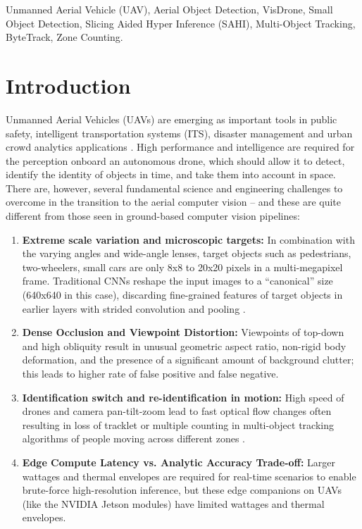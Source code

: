 \documentclass[conference]{IEEEtran}
\begin{document}
\begin{IEEEkeywords}
Unmanned Aerial Vehicle (UAV), Aerial Object Detection, VisDrone, Small Object Detection, Slicing Aided Hyper Inference (SAHI), Multi-Object Tracking, ByteTrack, Zone Counting.
\end{IEEEkeywords}

\section{Introduction}
Unmanned Aerial Vehicles (UAVs) are emerging as important tools in public safety, intelligent transportation systems (ITS), disaster management and urban crowd analytics applications \cite{zhu2021detection, akyon2022sahi}. High performance and intelligence are required for the perception onboard an autonomous drone, which should allow it to detect, identify the identity of objects in time, and take them into account in space. There are, however, several fundamental science and engineering challenges to overcome in the transition to the aerial computer vision -- and these are quite different from those seen in ground-based computer vision pipelines:

\begin{enumerate}
    \item \textbf{Extreme scale variation and microscopic targets:} In combination with the varying angles and wide-angle lenses, target objects such as pedestrians, two-wheelers, small cars are only 8x8 to 20x20 pixels in a multi-megapixel frame. Traditional CNNs reshape the input images to a ``canonical'' size (640x640 in this case), discarding fine-grained features of target objects in earlier layers with strided convolution and pooling \cite{akyon2022sahi}.
    \item \textbf{Dense Occlusion and Viewpoint Distortion:} Viewpoints of top-down and high obliquity result in unusual geometric aspect ratio, non-rigid body deformation, and the presence of a significant amount of background clutter; this leads to higher rate of false positive and false negative.
    \item \textbf{Identification switch and re-identification in motion:} High speed of drones and camera pan-tilt-zoom lead to fast optical flow changes often resulting in loss of tracklet or multiple counting in multi-object tracking algorithms of people moving across different zones \cite{zhang2022bytetrack}.
    \item \textbf{Edge Compute Latency vs. Analytic Accuracy Trade-off:} Larger wattages and thermal envelopes are required for real-time scenarios to enable brute-force high-resolution inference, but these edge companions on UAVs (like the NVIDIA Jetson modules) have limited wattages and thermal envelopes.
\end{enumerate}
\end{document}
